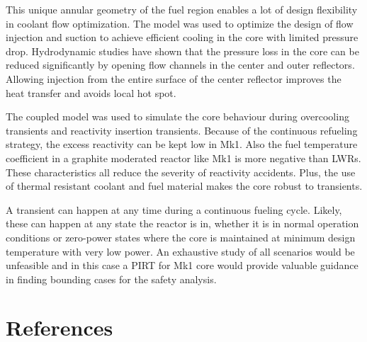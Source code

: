 \documentclass{elsarticle}
\begin{document}
This unique annular geometry of the fuel region enables a lot of design flexibility in coolant flow optimization. The model was used to optimize the design of flow injection and suction to achieve efficient cooling in the core with limited pressure drop. Hydrodynamic studies have shown that the pressure loss in the core can be reduced significantly by opening flow channels in the center and outer reflectors. Allowing injection from the entire surface of the center reflector improves the heat transfer and avoids local hot spot.

The coupled model was used to simulate the core behaviour during overcooling transients and reactivity insertion transients. Because of the continuous refueling strategy, the excess reactivity can be kept low in Mk1. Also the fuel temperature coefficient in a graphite moderated reactor like Mk1 is more negative than LWRs. These characteristics all reduce the severity of reactivity accidents. Plus, the use of thermal resistant coolant and fuel material makes the core robust to transients.

A transient can happen at any time during a continuous fueling cycle. Likely, these can happen at any state the reactor is in, whether it is in normal operation conditions or zero-power states where the core is maintained at minimum design temperature with very low power.
An exhaustive study of all scenarios would be unfeasible and in this case a PIRT for Mk1 core would provide valuable guidance in finding bounding cases for the safety analysis.


\section*{References}

\end{document}
